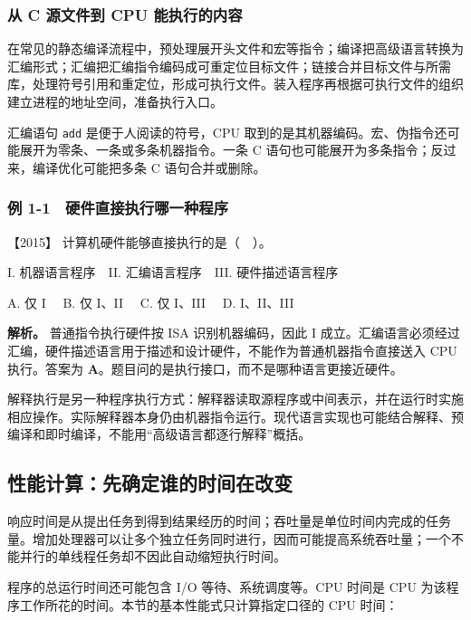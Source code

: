 \subsubsection{从 C 源文件到 CPU 能执行的内容}\label{ux4ece-c-ux6e90ux6587ux4ef6ux5230-cpu-ux80fdux6267ux884cux7684ux5185ux5bb9}

在常见的静态编译流程中，预处理展开头文件和宏等指令；编译把高级语言转换为汇编形式；汇编把汇编指令编码成可重定位目标文件；链接合并目标文件与所需库，处理符号引用和重定位，形成可执行文件。装入程序再根据可执行文件的组织建立进程的地址空间，准备执行入口。

汇编语句 \texttt{add} 是便于人阅读的符号，CPU 取到的是其机器编码。宏、伪指令还可能展开为零条、一条或多条机器指令。一条 C 语句也可能展开为多条指令；反过来，编译优化可能把多条 C 语句合并或删除。

\subsubsection{例 1-1　硬件直接执行哪一种程序}\label{co-ex1-1}

\noindent{}【2015】 计算机硬件能够直接执行的是（　）。

I. 机器语言程序　II. 汇编语言程序　III. 硬件描述语言程序

A. 仅 I　 B. 仅 I、II　 C. 仅 I、III　 D. I、II、III


\textbf{解析。} 普通指令执行硬件按 ISA 识别机器编码，因此 I 成立。汇编语言必须经过汇编，硬件描述语言用于描述和设计硬件，不能作为普通机器指令直接送入 CPU 执行。答案为 \textbf{A}。题目问的是执行接口，而不是哪种语言更接近硬件。

解释执行是另一种程序执行方式：解释器读取源程序或中间表示，并在运行时实施相应操作。实际解释器本身仍由机器指令运行。现代语言实现也可能结合解释、预编译和即时编译，不能用``高级语言都逐行解释''概括。

\subsection{性能计算：先确定谁的时间在改变}\label{co-01-03}

响应时间是从提出任务到得到结果经历的时间；吞吐量是单位时间内完成的任务量。增加处理器可以让多个独立任务同时进行，因而可能提高系统吞吐量；一个不能并行的单线程任务却不因此自动缩短执行时间。

程序的总运行时间还可能包含 I/O 等待、系统调度等。CPU 时间是 CPU 为该程序工作所花的时间。本节的基本性能式只计算指定口径的 CPU 时间：

